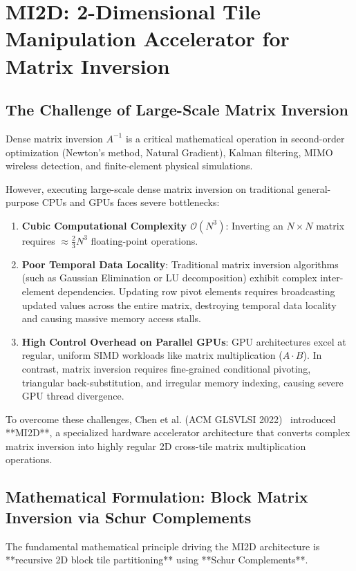 \chapter{MI2D: 2-Dimensional Tile Manipulation Accelerator for Matrix Inversion}
\label{ch:mi2d}

\section{The Challenge of Large-Scale Matrix Inversion}
Dense matrix inversion $A^{-1}$ is a critical mathematical operation in second-order optimization (Newton's method, Natural Gradient), Kalman filtering, MIMO wireless detection, and finite-element physical simulations.

However, executing large-scale dense matrix inversion on traditional general-purpose CPUs and GPUs faces severe bottlenecks:
\begin{enumerate}[leftmargin=*]
    \item \textbf{Cubic Computational Complexity $\mathcal{O}(N^3)$}: Inverting an $N \times N$ matrix requires $\approx \frac{2}{3} N^3$ floating-point operations.
    \item \textbf{Poor Temporal Data Locality}: Traditional matrix inversion algorithms (such as Gaussian Elimination or LU decomposition) exhibit complex inter-element dependencies. Updating row pivot elements requires broadcasting updated values across the entire matrix, destroying temporal data locality and causing massive memory access stalls.
    \item \textbf{High Control Overhead on Parallel GPUs}: GPU architectures excel at regular, uniform SIMD workloads like matrix multiplication ($A \cdot B$). In contrast, matrix inversion requires fine-grained conditional pivoting, triangular back-substitution, and irregular memory indexing, causing severe GPU thread divergence.
\end{enumerate}

To overcome these challenges, Chen et al. (ACM GLSVLSI 2022)~\cite{chen2022mi2d} introduced **MI2D**, a specialized hardware accelerator architecture that converts complex matrix inversion into highly regular 2D cross-tile matrix multiplication operations.

\section{Mathematical Formulation: Block Matrix Inversion via Schur Complements}
The fundamental mathematical principle driving the MI2D architecture is **recursive 2D block tile partitioning** using **Schur Complements**.


